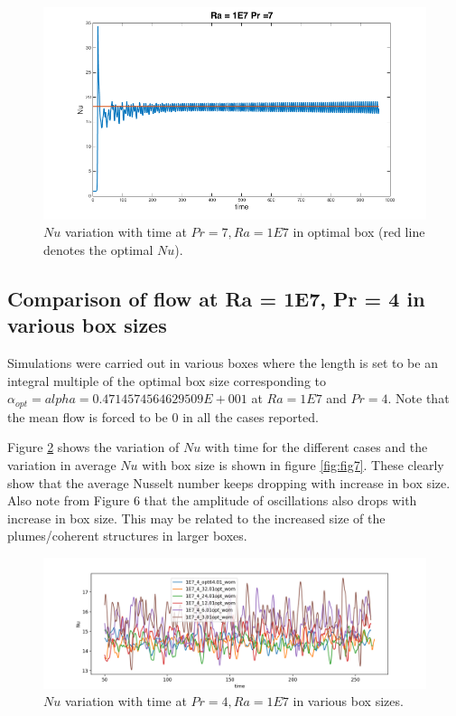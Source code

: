 \documentclass[12pt]{article}
\begin{document}
      \begin{figure}[!htb]
      	\includegraphics[width=\linewidth]{Nu1E77opt.png}
      	\caption{$Nu$ variation with time at $Pr = 7, Ra = 1E7$ in optimal box (red line denotes the optimal $Nu$).}
      	\label{fig:fig5}
      \end{figure}  
      
      \subsection{Comparison of flow at Ra = 1E7, Pr = 4 in various box sizes}
      
      Simulations were carried out in various boxes where the length is set to be an integral multiple of the optimal box size corresponding to $\alpha_{opt} = alpha = 0.4714574564629509E+001$ at $Ra = 1E7$ and $Pr = 4$. Note that the mean flow is forced to be 0 in all the cases reported.
      
      Figure \ref{fig:fig6} shows the variation of $Nu$ with time for the different cases and the variation in average $Nu$ with box size is shown in figure \ref{fig:fig7}. These clearly show that the average Nusselt number keeps dropping with increase in box size. Also note from Figure 6 that the amplitude of oscillations also drops with increase in box size. This may be related to the increased size of the plumes/coherent structures in larger boxes.
      
      \begin{figure}[!htb]
      	\includegraphics[width=\linewidth]{Nu_1E7_4.png}
      	\caption{$Nu$ variation with time at $Pr = 4, Ra = 1E7$ in various box sizes.}
      	\label{fig:fig6}
      \end{figure} 
      
\end{document}
